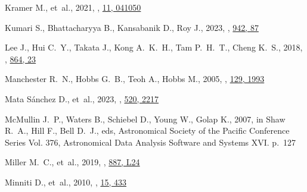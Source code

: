 \documentclass[fleqn,usenatbib]{mnras}
\begin{document}
\begin{thebibliography}{99}
{Kramer} M.,  et~al., 2021, , \href {https://ui.adsabs.harvard.edu/abs/2021PhRvX..11d1050K} {11, 041050}

{Kumari} S.,  {Bhattacharyya} B.,  {Kansabanik} D.,   {Roy} J.,  2023, , \href {https://ui.adsabs.harvard.edu/abs/2023ApJ...942...87K} {942, 87}

{Lee} J.,  {Hui} C.~Y.,  {Takata} J.,  {Kong} A.~K.~H.,  {Tam} P.~H.~T.,   {Cheng} K.~S.,  2018, , \href {https://ui.adsabs.harvard.edu/abs/2018ApJ...864...23L} {864, 23}

{Manchester} R.~N.,  {Hobbs} G.~B.,  {Teoh} A.,   {Hobbs} M.,  2005, , \href {https://ui.adsabs.harvard.edu/abs/2005AJ....129.1993M} {129, 1993}

{Mata S{\'a}nchez} D.,  et~al., 2023, , \href {https://ui.adsabs.harvard.edu/abs/2023MNRAS.520.2217M} {520, 2217}

{McMullin} J.~P.,  {Waters} B.,  {Schiebel} D.,  {Young} W.,   {Golap} K.,  2007, in {Shaw} R.~A.,  {Hill} F.,   {Bell} D.~J.,  eds,  Astronomical Society of the Pacific Conference Series Vol. 376, Astronomical Data Analysis Software and Systems XVI. p.~127

{Miller} M.~C.,  et~al., 2019, , \href {https://ui.adsabs.harvard.edu/abs/2019ApJ...887L..24M} {887, L24}

{Minniti} D.,  et~al., 2010, , \href {https://ui.adsabs.harvard.edu/abs/2010NewA...15..433M} {15, 433}


\end{thebibliography}
\end{document}
